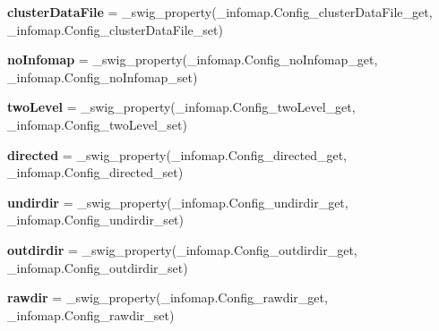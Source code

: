 \begin{DoxyCompactItemize}
\item 
\mbox{\label{classinfomapfolder_1_1infomap_1_1Config_a7b709dc20dadc515c25c9380a42f98c4}} 
{\bfseries cluster\+Data\+File} = \+\_\+swig\+\_\+property(\+\_\+infomap.\+Config\+\_\+cluster\+Data\+File\+\_\+get, \+\_\+infomap.\+Config\+\_\+cluster\+Data\+File\+\_\+set)
\item 
\mbox{\label{classinfomapfolder_1_1infomap_1_1Config_aed6ea24c144b830fa4a4c0fbb734dade}} 
{\bfseries no\+Infomap} = \+\_\+swig\+\_\+property(\+\_\+infomap.\+Config\+\_\+no\+Infomap\+\_\+get, \+\_\+infomap.\+Config\+\_\+no\+Infomap\+\_\+set)
\item 
\mbox{\label{classinfomapfolder_1_1infomap_1_1Config_af35e3733cb55435411ba35647514fdb3}} 
{\bfseries two\+Level} = \+\_\+swig\+\_\+property(\+\_\+infomap.\+Config\+\_\+two\+Level\+\_\+get, \+\_\+infomap.\+Config\+\_\+two\+Level\+\_\+set)
\item 
\mbox{\label{classinfomapfolder_1_1infomap_1_1Config_a20a11172e3a6b028b79dd4e63266f2a3}} 
{\bfseries directed} = \+\_\+swig\+\_\+property(\+\_\+infomap.\+Config\+\_\+directed\+\_\+get, \+\_\+infomap.\+Config\+\_\+directed\+\_\+set)
\item 
\mbox{\label{classinfomapfolder_1_1infomap_1_1Config_ad1126ed225ccb1c4ba9bf41202afbc54}} 
{\bfseries undirdir} = \+\_\+swig\+\_\+property(\+\_\+infomap.\+Config\+\_\+undirdir\+\_\+get, \+\_\+infomap.\+Config\+\_\+undirdir\+\_\+set)
\item 
\mbox{\label{classinfomapfolder_1_1infomap_1_1Config_aac3c90c0adfa7b1b69aebca559800ccb}} 
{\bfseries outdirdir} = \+\_\+swig\+\_\+property(\+\_\+infomap.\+Config\+\_\+outdirdir\+\_\+get, \+\_\+infomap.\+Config\+\_\+outdirdir\+\_\+set)
\item 
\mbox{\label{classinfomapfolder_1_1infomap_1_1Config_a286ae666847c40c72636c9e28b358bcc}} 
{\bfseries rawdir} = \+\_\+swig\+\_\+property(\+\_\+infomap.\+Config\+\_\+rawdir\+\_\+get, \+\_\+infomap.\+Config\+\_\+rawdir\+\_\+set)

\end{DoxyCompactItemize}

